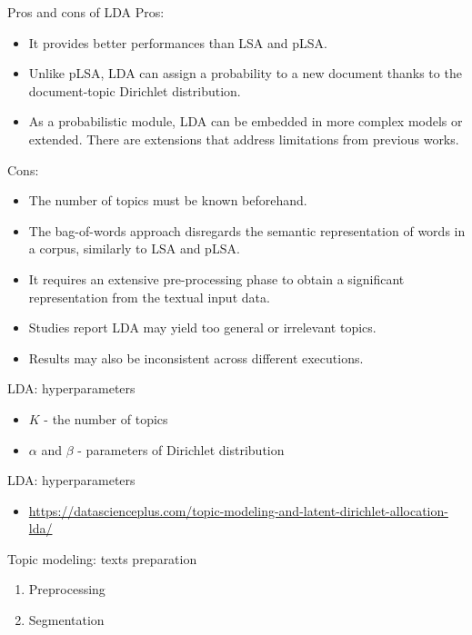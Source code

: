 \documentclass[svgnames]{beamer}
\begin{document}
    \begin{frame}{Pros and cons of LDA}
        Pros:
        \begin{itemize}
            \item It provides better performances than LSA and pLSA.
            \item Unlike pLSA, LDA can assign a probability to a new document thanks to the document-topic Dirichlet distribution.
            \item As a probabilistic module, LDA can be embedded in more complex models or extended. There are extensions that address limitations from previous works.
        \end{itemize}
        Cons:
        \begin{itemize}
            \item The number of topics must be known beforehand.
            \item The bag-of-words approach disregards the semantic representation of words in a corpus, similarly to LSA and pLSA.
            \item It requires an extensive pre-processing phase to obtain a significant representation from the textual input data.
            \item Studies report LDA may yield too general or irrelevant topics.
            \item Results may also be inconsistent across different executions.
        \end{itemize}
    \end{frame}

    \begin{frame}{LDA: hyperparameters}
        \begin{itemize}
            \item $K$ - the number of topics
            \item $\alpha$ and $\beta$ - parameters of Dirichlet distribution
        \end{itemize}
    \end{frame}

    \begin{frame}{LDA: hyperparameters}
        \begin{itemize}
            \item \url{https://datascienceplus.com/topic-modeling-and-latent-dirichlet-allocation-lda/}
        \end{itemize}
    \end{frame}

    \begin{frame}{Topic modeling: texts preparation}
        \begin{enumerate}
            \item Preprocessing
            \item Segmentation
        \end{enumerate}
    \end{frame}
\end{document}
